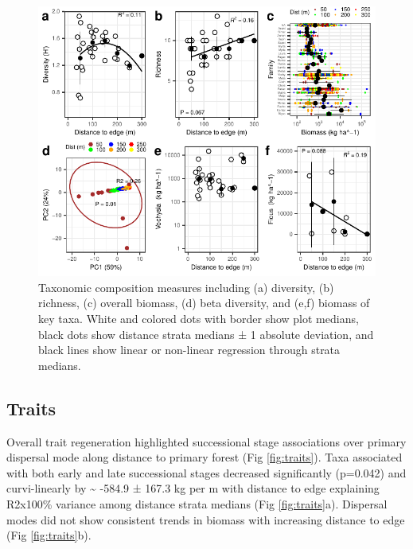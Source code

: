 \documentclass[
  12pt,
]{article}
\begin{document}
\begin{figure}
\centering
\includegraphics{merge_files/figure-latex/taxa-1.pdf}
\caption{\label{fig:taxa} Taxonomic composition measures including (a) diversity, (b) richness, (c) overall biomass, (d) beta diversity, and (e,f) biomass of key taxa. White and colored dots with border show plot medians, black dots show distance strata medians ± 1 absolute deviation, and black lines show linear or non-linear regression through strata medians.}
\end{figure}

\hypertarget{traits}{%
\subsection{Traits}\label{traits}}

Overall trait regeneration highlighted successional stage associations over primary dispersal mode along distance to primary forest
(Fig \ref{fig:traits}).
Taxa associated with both early and late successional stages decreased significantly
(p=0.042)
and curvi-linearly
by
\textasciitilde{} -584.9 ±
167.3 kg per m
with distance to edge explaining
R2x100\% variance
among distance strata medians
(Fig \ref{fig:traits}a).
Dispersal modes did not show consistent trends in biomass with increasing distance to edge
(Fig \ref{fig:traits}b).
\end{document}

